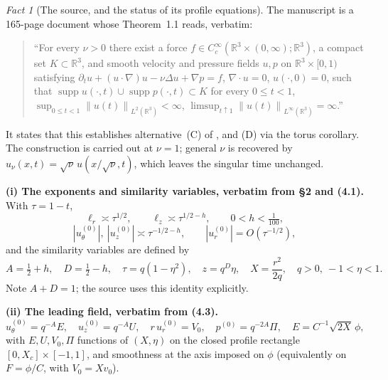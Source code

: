\documentclass[11pt]{article}
\theoremstyle{definition}
\theoremstyle{remark}
\newtheorem{fact}[theorem]{Fact}
\newcommand{\R}{\mathbb{R}}
\newcommand{\norm}[1]{\left\|#1\right\|}
\newcommand{\abs}[1]{\left|#1\right|}
\begin{document}
\begin{fact}[The source, and the status of its profile equations]
  \label{fact:wpt2-source}
  The manuscript \cite{OpenAI2026} is a 165-page document whose
  Theorem~1.1 reads, verbatim:

  \begin{quote}
    ``For every $\nu>0$ there exist a force $f\in C_c^\infty(\R^3\times
    (0,\infty);\R^3)$, a compact set $K\subset\R^3$, and smooth velocity and
    pressure fields $u,p$ on $\R^3\times[0,1)$ satisfying
    $\partial_tu+(u\cdot\nabla)u-\nu\Delta u+\nabla p=f$, $\nabla\cdot u=0$,
    $u(\cdot,0)=0$, such that
    $\operatorname{supp}u(\cdot,t)\cup\operatorname{supp}p(\cdot,t)\subset K$
    for every $0\leq t<1$,
    $\sup_{0\leq t<1}\norm{u(t)}_{L^2(\R^3)}<\infty$,
    $\limsup_{t\uparrow1}\norm{u(t)}_{L^\infty(\R^3)}=\infty$.''
  \end{quote}

  \noindent It states that this establishes alternative~(C) of \cite{Fefferman2000},
  and (D) via the torus corollary. The construction is carried out at
  $\nu=1$; general $\nu$ is recovered by
  $u_\nu(x,t)=\sqrt\nu\,u(x/\sqrt\nu,t)$, which leaves the singular time
  unchanged.

  \textbf{(i) The exponents and similarity variables, verbatim from
  \S2 and (4.1).} With $\tau=1-t$,
  \[
    \ell_r\asymp\tau^{1/2},\qquad \ell_z\asymp\tau^{1/2-h},\qquad
    0<h<\tfrac1{100},
  \]
  \[
    \abs{u^{(0)}_\theta},\ \abs{u^{(0)}_z}\asymp\tau^{-1/2-h},
    \qquad \abs{u^{(0)}_r}=O(\tau^{-1/2}),
  \]
  and the similarity variables are defined by
  \begin{equation}\label{eq:wpt2-simvars}
    A=\tfrac12+h,\quad D=\tfrac12-h,\quad
    \tau=q(1-\eta^2),\quad z=q^D\eta,\quad
    X=\frac{r^2}{2q},\quad q>0,\ -1<\eta<1 .
  \end{equation}
  Note $A+D=1$; the source uses this identity explicitly.

  \textbf{(ii) The leading field, verbatim from (4.3).}
  \begin{equation}\label{eq:wpt2-ansatz}
    u^{(0)}_\theta=q^{-A}E,\quad
    u^{(0)}_z=q^{-A}U,\quad
    r\,u^{(0)}_r=V_0,\quad
    p^{(0)}=q^{-2A}\Pi,\quad
    E=C^{-1}\sqrt{2X}\,\phi,
  \end{equation}
  with $E,U,V_0,\Pi$ functions of $(X,\eta)$ on the closed profile rectangle
  $[0,X_c]\times[-1,1]$, and smoothness at the axis imposed on
  $\phi$ (equivalently on $F=\phi/C$, with $V_0=Xv_0$).


\end{fact}
\end{document}
